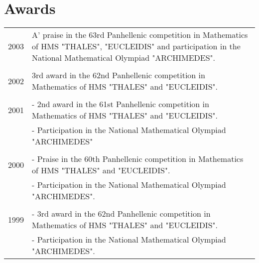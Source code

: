\documentclass[a4paper]{Classes/cv_prof_en} %
\begin{document}
\section{Awards}
\begin{tabular}{rp{15.5cm}}
2003 & A' praise in the 63rd Panhellenic competition in Mathematics of HMS "THALES", "EUCLEIDIS" and participation in the National Mathematical Olympiad "ARCHIMEDES".\\
\multicolumn{2}{c}{} \\
2002 & 3rd award in the  62nd Panhellenic competition in Mathematics of HMS "THALES" and "EUCLEIDIS".\\
\multicolumn{2}{c}{} \\
2001 & - 2nd award in the  61st Panhellenic competition in Mathematics of HMS "THALES" and "EUCLEIDIS".\\
     & - Participation in the National Mathematical Olympiad "ARCHIMEDES"\\
\multicolumn{2}{c}{} \\
2000 & - Praise in the  60th Panhellenic competition in Mathematics of HMS "THALES" and "EUCLEIDIS".\\
     & - Participation in the National Mathematical Olympiad "ARCHIMEDES".\\
\multicolumn{2}{c}{} \\
1999 & - 3rd award in the  62nd Panhellenic competition in Mathematics of HMS "THALES" and "EUCLEIDIS".\\
     & - Participation in the National Mathematical Olympiad "ARCHIMEDES".
\end{tabular}

\end{document}
